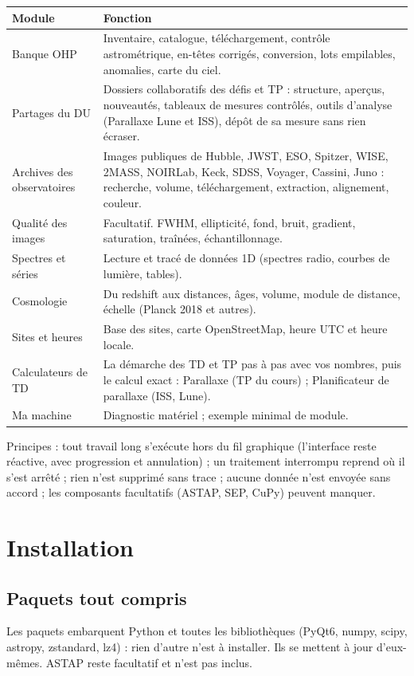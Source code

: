 \begin{center}\small
\begin{tabularx}{\linewidth}{@{}lX@{}}
\toprule
\textbf{Module} & \textbf{Fonction}\\
\midrule
Banque OHP & Inventaire, catalogue, téléchargement, contrôle astrométrique, en-têtes corrigés, conversion, lots empilables, anomalies, carte du ciel.\\
Partages du DU & Dossiers collaboratifs des défis et TP : structure, aperçus, nouveautés, tableaux de mesures contrôlés, outils d'analyse (Parallaxe Lune et ISS), dépôt de sa mesure sans rien écraser.\\
Archives des observatoires & Images publiques de Hubble, JWST, ESO, Spitzer, WISE, 2MASS, NOIRLab, Keck, SDSS, Voyager, Cassini, Juno : recherche, volume, téléchargement, extraction, alignement, couleur.\\
Qualité des images & Facultatif. FWHM, ellipticité, fond, bruit, gradient, saturation, traînées, échantillonnage.\\
Spectres et séries & Lecture et tracé de données 1D (spectres radio, courbes de lumière, tables).\\
Cosmologie & Du redshift aux distances, âges, volume, module de distance, échelle (Planck 2018 et autres).\\
Sites et heures & Base des sites, carte OpenStreetMap, heure UTC et heure locale.\\
Calculateurs de TD & La démarche des TD et TP pas à pas avec vos nombres, puis le calcul exact : Parallaxe (TP du cours) ; Planificateur de parallaxe (ISS, Lune).\\
Ma machine & Diagnostic matériel ; exemple minimal de module.\\
\bottomrule
\end{tabularx}
\end{center}

Principes : tout travail long s'exécute hors du fil graphique (l'interface reste réactive, avec progression et
annulation) ; un traitement interrompu reprend où il s'est arrêté ; rien n'est supprimé sans trace ; aucune
donnée n'est envoyée sans accord ; les composants facultatifs (ASTAP, SEP, CuPy) peuvent manquer.

\section{Installation}
\subsection{Paquets tout compris}
Les paquets embarquent Python et toutes les bibliothèques (PyQt6, numpy, scipy, astropy, zstandard, lz4) : rien
d'autre n'est à installer. Ils se mettent à jour d'eux-mêmes. ASTAP reste facultatif et n'est pas inclus.

